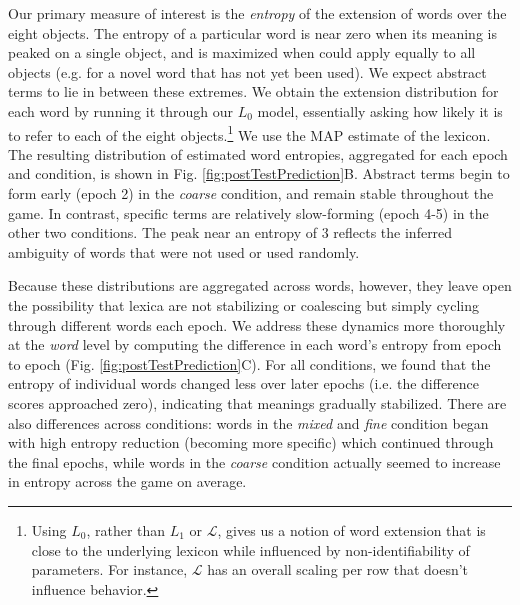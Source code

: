 Our primary measure of interest is the \emph{entropy} of the extension of words over the eight objects. The entropy of a particular word is near zero when its meaning is peaked on a single object, and is maximized when could apply equally to all objects (e.g. for a novel word that has not yet been used). 
We expect abstract terms to lie in between these extremes. 
We obtain the extension distribution for each word by running it through our $L_0$ model, essentially asking how likely it is to refer to each of the eight objects.\footnote{Using $L_0$, rather than $L_1$ or $\mathcal{L}$, gives us a notion of word extension that is close to the underlying lexicon while influenced by non-identifiability of parameters. For instance, $\mathcal{L}$ has an overall scaling per row that doesn't influence behavior.} 
We use the MAP estimate of the lexicon. %
The resulting distribution of estimated word entropies, aggregated for each epoch and condition, is shown in Fig. \ref{fig:postTestPrediction}B. %
Abstract terms begin to form early (epoch 2) in the \emph{coarse} condition, and remain stable throughout the game. In contrast, specific terms are relatively slow-forming (epoch 4-5) in the other two conditions. The peak near an entropy of 3 reflects the inferred ambiguity of words that were not used or used randomly.

Because these distributions are aggregated across words, however, they leave open the possibility that lexica are not stabilizing or coalescing but simply cycling through different words each epoch. We address these dynamics more thoroughly at the \emph{word} level by computing the difference in each word's entropy from epoch to epoch (Fig. \ref{fig:postTestPrediction}C). For all conditions, we found that the entropy of individual words changed less over later epochs (i.e. the difference scores approached zero), indicating that meanings gradually stabilized. There are also differences across conditions: words in the \emph{mixed} and \emph{fine} condition began with high entropy reduction (becoming more specific) which continued through the final epochs, while words in the \emph{coarse} condition actually seemed to increase in entropy across the game on average. %

